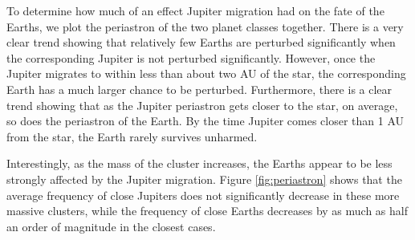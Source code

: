 \documentclass[12pt]{article}
\begin{document}
    To determine how much of an effect Jupiter migration had on the fate of the
    Earths, we plot the periastron of the two planet classes together. There is a
    very clear trend showing that relatively few Earths are perturbed significantly
    when the corresponding Jupiter is not perturbed significantly. However, once the 
    Jupiter migrates to within less than about two AU of the star, the corresponding Earth
    has a much larger chance to be perturbed. Furthermore, there is a clear trend
    showing that as the Jupiter periastron gets closer to the star, on average, so does
    the periastron of the Earth. By the time Jupiter comes closer than 1 AU 
    from the star, the Earth rarely survives unharmed.

    Interestingly, as the mass of the cluster increases, the Earths appear to be
    less strongly affected by the Jupiter migration. Figure \ref{fig:periastron}
    shows that the average frequency of close Jupiters does not significantly decrease
    in these more massive clusters, while the frequency of close Earths decreases
    by as much as half an order of magnitude in the closest cases.
\end{document}
